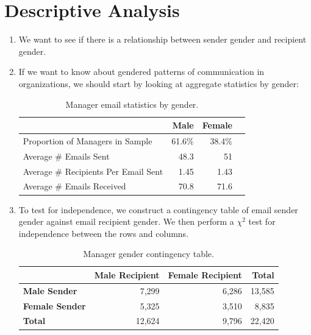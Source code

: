 \documentclass[fleqn]{MJDArticle}
\begin{document}
\section{Descriptive Analysis}
\begin{enumerate}
	
	\item We want to see if there is a relationship between sender gender and recipient gender.
	\item If we want to know about gendered patterns of communication in organizations, we should start by looking at aggregate statistics by gender:
	
	
	\begin{table}[H]
	\centering
		\begin{tabular}{m{2in}rrr}
		\toprule
	& \textbf{Male} & \textbf{Female}  \\
		 \midrule
		 Proportion of Managers in Sample & 61.6\%& 38.4\% \\
		 \midrule
		 Average \# Emails Sent & 48.3 & 51 \\
		 Average \# Recipients Per Email Sent & 1.45 & 1.43 \\
		 \midrule
		 Average \# Emails Received & 70.8 & 71.6 \\
		\bottomrule
		\end{tabular}
		\caption{\label{tab:email agg stats}Manager email statistics by gender.}
	\end{table}
	
	
	\item To test for independence, we construct a contingency table of email sender gender against email recipient gender. We then perform a $\chi^2$ test for independence between the rows and columns.
	
	\begin{table}[H]
	\centering
		\begin{tabular}{lrr|r}
		\toprule
	& \textbf{Male Recipient} & \textbf{Female Recipient} & \textbf{Total}  \\
		 \midrule
		 \textbf{Male Sender} & 7,299 & 6,286 & 13,585 \\
		 \textbf{Female Sender} & 5,325 & 3,510 & 8,835 \\
		 \midrule
		 \textbf{Total} & 12,624 & 9,796 & 22,420\\
		\bottomrule
		\end{tabular}
		\caption{\label{tab:email agg stats}Manager gender contingency table.}
	\end{table}
	

\end{enumerate}
\end{document}
